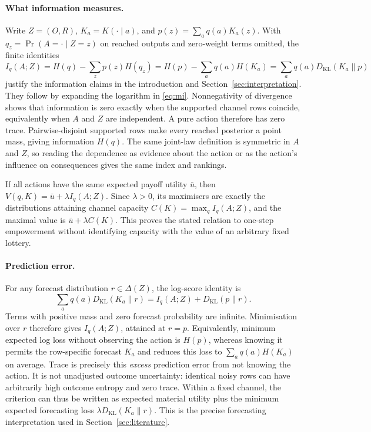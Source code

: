 \documentclass[11pt,a4paper]{article}
\theoremstyle{definition}
\newcommand{\D}{\Delta}
\newcommand{\I}{I}
\newcommand{\Sh}{H}
\newcommand{\KL}{D_{\mathrm{KL}}}
\newcommand{\1}{\mathbf 1}
\begin{document}
\paragraph{What information measures.}
Write $Z=(O,R)$, $K_a=K(\cdot\mid a)$, and $p(z)=\sum_aq(a)K_a(z)$.
With $q_z=\Pr(A=\cdot\mid Z=z)$ on reached outputs and zero-weight
terms omitted, the finite identities
\[
 \I_q(A;Z)
 =\Sh(q)-\sum_zp(z)\Sh(q_z)
 =\Sh(p)-\sum_aq(a)\Sh(K_a)
 =\sum_aq(a)\KL(K_a\|p)
\]
justify the information claims in the introduction and
Section~\ref{sec:interpretation}.  They follow by expanding the logarithm
in \eqref{eq:mi}.  Nonnegativity of divergence shows that information is
zero exactly when the supported channel rows coincide, equivalently when
$A$ and $Z$ are independent.  A pure action therefore has zero trace.
Pairwise-disjoint supported rows make every reached posterior a point mass,
giving information $\Sh(q)$.  The same joint-law definition is symmetric
in $A$ and $Z$, so reading the dependence as evidence about the action or
as the action's influence on consequences gives the same index and rankings.

If all actions have the same expected payoff utility $\bar u$, then
$V(q,K)=\bar u+\lambda\I_q(A;Z)$.  Since $\lambda>0$, its maximisers are
exactly the distributions attaining channel capacity
$C(K)=\max_q\I_q(A;Z)$, and the maximal value is
$\bar u+\lambda C(K)$.  This proves the stated relation to one-step
empowerment without identifying capacity with the value of an arbitrary
fixed lottery.

\paragraph{Prediction error.}
For any forecast distribution $r\in\D(Z)$, the log-score identity is
\[
 \sum_aq(a)\KL(K_a\|r)
 =\I_q(A;Z)+\KL(p\|r).
\]
Terms with positive mass and zero forecast probability are infinite.
Minimisation over $r$ therefore gives $\I_q(A;Z)$, attained at $r=p$.
Equivalently, minimum expected log loss without observing the action is
$\Sh(p)$, whereas knowing it permits the row-specific forecast $K_a$ and
reduces this loss to $\sum_aq(a)\Sh(K_a)$ on average.
Trace is precisely this \emph{excess} prediction error from not knowing
the action.  It is not unadjusted outcome uncertainty: identical noisy
rows can have arbitrarily high outcome entropy and zero trace.
Within a fixed channel, the criterion can thus be written as expected
material utility plus the minimum expected forecasting loss
$\lambda\KL(K_a\|r)$.  This is the precise forecasting interpretation used
in Section~\ref{sec:literature}.
\end{document}
